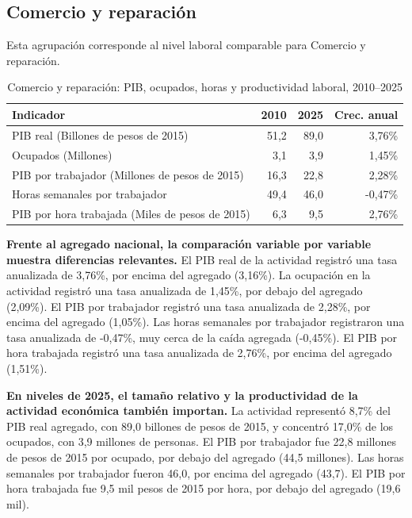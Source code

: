 \subsection{Comercio y reparación}

Esta agrupación corresponde al nivel laboral comparable para Comercio y reparación.

\begin{table}[H]
\centering
\caption{Comercio y reparación: PIB, ocupados, horas y productividad laboral, 2010--2025}
\label{tab:agg25_g_productividad}
\small
\begin{tabular}{lrrr}
\toprule
Indicador & 2010 & 2025 & Crec. anual \\
\midrule
PIB real  (Billones de pesos de 2015) & 51,2 & 89,0 & 3,76\% \\
Ocupados (Millones) & 3,1 & 3,9 & 1,45\% \\
PIB por trabajador (Millones de pesos de 2015) & 16,3 & 22,8 & 2,28\% \\
Horas semanales por trabajador & 49,4 & 46,0 & -0,47\% \\
PIB por hora trabajada (Miles de pesos de 2015) & 6,3 & 9,5 & 2,76\% \\
\bottomrule
\end{tabular}
\end{table}

\textbf{Frente al agregado nacional, la comparación variable por variable muestra diferencias relevantes.} El PIB real de la actividad registró una tasa anualizada de 3,76\%, por encima del agregado (3,16\%). La ocupación en la actividad registró una tasa anualizada de 1,45\%, por debajo del agregado (2,09\%). El PIB por trabajador registró una tasa anualizada de 2,28\%, por encima del agregado (1,05\%). Las horas semanales por trabajador registraron una tasa anualizada de -0,47\%, muy cerca de la caída agregada (-0,45\%). El PIB por hora trabajada registró una tasa anualizada de 2,76\%, por encima del agregado (1,51\%).

\textbf{En niveles de 2025, el tamaño relativo y la productividad de la actividad económica también importan.} La actividad representó 8,7\% del PIB real agregado, con 89,0 billones de pesos de 2015, y concentró 17,0\% de los ocupados, con 3,9 millones de personas. El PIB por trabajador fue 22,8 millones de pesos de 2015 por ocupado, por debajo del agregado (44,5 millones). Las horas semanales por trabajador fueron 46,0, por encima del agregado (43,7). El PIB por hora trabajada fue 9,5 mil pesos de 2015 por hora, por debajo del agregado (19,6 mil).


